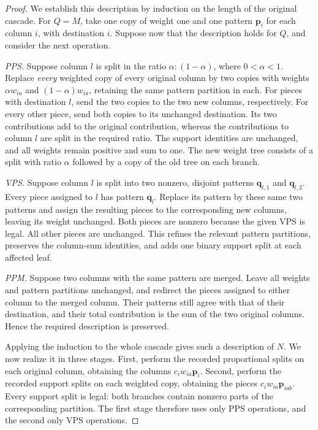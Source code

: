 \documentclass[12pt,a4paper]{article}
\newcommand{\pat}[1]{\boldsymbol{#1}}
\begin{document}
\begin{proof}
We establish this description by induction on the length of the original
cascade. For $Q=M$, take one copy of weight one and one pattern
$\pat{p}_i$ for each column $i$, with destination $i$. Suppose now that
the description holds for $Q$, and consider the next operation.

\emph{PPS.} Suppose column $l$ is split in the ratio
$\alpha:(1-\alpha)$, where $0<\alpha<1$. Replace \emph{every} weighted
copy of every original column by two copies with weights $\alpha w_{ia}$
and $(1-\alpha)w_{ia}$, retaining the same pattern partition in each.
For pieces with destination $l$, send the two copies to the two new
columns, respectively. For every other piece, send both copies to its
unchanged destination. Its two contributions add to the original
contribution, whereas the contributions to column $l$ are split in the
required ratio. The support identities are unchanged, and all weights
remain positive and sum to one. The new weight tree consists of a split
with ratio $\alpha$ followed by a copy of the old tree on each branch.

\newpage
\emph{VPS.} Suppose column $l$ is split into two nonzero, disjoint
patterns $\pat{q}_{l,1}$ and $\pat{q}_{l,2}$. Every piece assigned to $l$
has pattern $\pat{q}_l$. Replace its pattern by these same two patterns
and assign the resulting pieces to the corresponding new columns,
leaving its weight unchanged. Both pieces are nonzero because the given
VPS is legal. All other pieces are unchanged. This refines the relevant
pattern partitions, preserves the column-sum identities, and adds one
binary support split at each affected leaf.

\emph{PPM.} Suppose two columns with the same pattern are merged. Leave
all weights and pattern partitions unchanged, and redirect the pieces
assigned to either column to the merged column. Their patterns still
agree with that of their destination, and their total contribution is
the sum of the two original columns. Hence the required description is
preserved.

Applying the induction to the whole cascade gives such a description of
$N$. We now realize it in three stages. First, perform the recorded
proportional splits on each original column, obtaining the columns
$c_iw_{ia}\pat{p}_i$. Second, perform the recorded support splits on each
weighted copy, obtaining the pieces $c_iw_{ia}\pat{p}_{iab}$. Every
support split is legal: both branches contain nonzero parts of the
corresponding partition. The first stage therefore uses only PPS
operations, and the second only VPS operations.


\end{proof}
\end{document}
